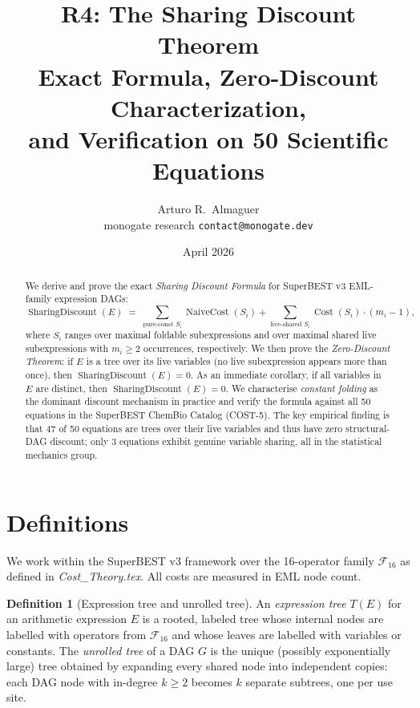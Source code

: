 \documentclass[12pt,a4paper]{article}
\title{R4: The Sharing Discount Theorem\\[6pt]
       \large Exact Formula, Zero-Discount Characterization,\\
       and Verification on 50 Scientific Equations}
\author{Arturo R.\ Almaguer\\
\small monogate research \quad \texttt{contact@monogate.dev}}
\date{April 2026}
\theoremstyle{definition}
\newtheorem{definition}[theorem]{Definition}
\newcommand{\Cost}{\operatorname{Cost}}
\newcommand{\NC}{\operatorname{NaiveCost}}
\newcommand{\SD}{\operatorname{SharingDiscount}}
\begin{document}
\maketitle

\begin{abstract}
We derive and prove the exact \emph{Sharing Discount Formula} for SuperBEST v3
EML-family expression DAGs:
\[
  \SD(E) \;=\;
    \sum_{\text{pure-const } S_i} \NC(S_i)
  + \sum_{\text{live-shared } S_i} \Cost(S_i) \cdot (m_i - 1),
\]
where $S_i$ ranges over maximal foldable subexpressions and over maximal
shared live subexpressions with $m_i \geq 2$ occurrences, respectively.
We then prove the \emph{Zero-Discount Theorem}: if $E$ is a tree over its
live variables (no live subexpression appears more than once), then
$\SD(E) = 0$.  As an immediate corollary, if all variables in $E$ are
distinct, then $\SD(E) = 0$.  We characterise \emph{constant folding} as the
dominant discount mechanism in practice and verify the formula against all 50
equations in the SuperBEST ChemBio Catalog (COST-5).  The key empirical
finding is that 47 of 50 equations are trees over their live variables and
thus have zero structural-DAG discount; only 3 equations exhibit genuine
variable sharing, all in the statistical mechanics group.
\end{abstract}

\tableofcontents
\bigskip

\section{Definitions}
\label{sec:defs}

We work within the SuperBEST v3 framework over the 16-operator family
$\mathcal{F}_{16}$ as defined in \textit{Cost\_Theory.tex}.  All costs are
measured in EML node count.

\begin{definition}[Expression tree and unrolled tree]
\label{def:tree}
An \emph{expression tree} $T(E)$ for an arithmetic expression $E$ is a
rooted, labeled tree whose internal nodes are labelled with operators from
$\mathcal{F}_{16}$ and whose leaves are labelled with variables or
constants.  The \emph{unrolled tree} of a DAG $G$ is the unique (possibly
exponentially large) tree obtained by expanding every shared node into
independent copies: each DAG node with in-degree $k \geq 2$ becomes $k$
separate subtrees, one per use site.
\end{definition}
\end{document}
